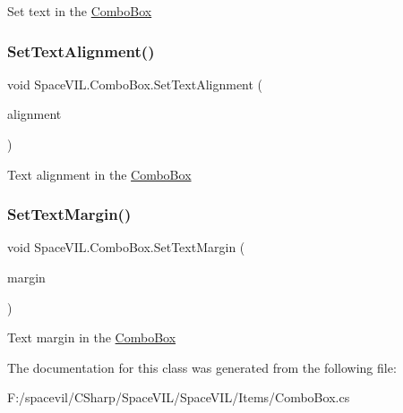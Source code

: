 Set text in the \mbox{\hyperlink{class_space_v_i_l_1_1_combo_box}{Combo\+Box}} 

\mbox{\label{class_space_v_i_l_1_1_combo_box_a43bcc26da1d80a462c541aea0a830b56}} 
\subsubsection{\texorpdfstring{Set\+Text\+Alignment()}{SetTextAlignment()}}
{\footnotesize\ttfamily void Space\+V\+I\+L.\+Combo\+Box.\+Set\+Text\+Alignment (\begin{DoxyParamCaption}\item[{Item\+Alignment}]{alignment }\end{DoxyParamCaption})}



Text alignment in the \mbox{\hyperlink{class_space_v_i_l_1_1_combo_box}{Combo\+Box}} 

\mbox{\label{class_space_v_i_l_1_1_combo_box_ad770a207c2e8525603e55f584605299b}} 
\subsubsection{\texorpdfstring{Set\+Text\+Margin()}{SetTextMargin()}}
{\footnotesize\ttfamily void Space\+V\+I\+L.\+Combo\+Box.\+Set\+Text\+Margin (\begin{DoxyParamCaption}\item[{\mbox{\hyperlink{struct_space_v_i_l_1_1_decorations_1_1_indents}{Indents}}}]{margin }\end{DoxyParamCaption})}



Text margin in the \mbox{\hyperlink{class_space_v_i_l_1_1_combo_box}{Combo\+Box}} 



The documentation for this class was generated from the following file\+:\begin{DoxyCompactItemize}
\item 
F\+:/spacevil/\+C\+Sharp/\+Space\+V\+I\+L/\+Space\+V\+I\+L/\+Items/Combo\+Box.\+cs\end{DoxyCompactItemize}
